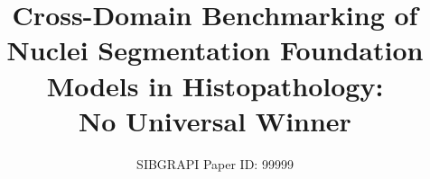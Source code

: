 \documentclass[10pt,conference]{IEEEtran}
\newif\iffinal
\newcommand{\cmtid}{99999}
\begin{document}
\title{Cross-Domain Benchmarking of Nuclei Segmentation Foundation Models in Histopathology:\\ No Universal Winner}

\iffinal
\author{\IEEEauthorblockN{Lucca S. P. Lacerda\IEEEauthorrefmark{1},
Matheus Fagundes\IEEEauthorrefmark{1},
Marcela F. A. Ribeiro\IEEEauthorrefmark{2},
Martinho C. R. Horta\IEEEauthorrefmark{2},
Giovanna R. Souto\IEEEauthorrefmark{2},\\
Alexandre X. Falc\~ao\IEEEauthorrefmark{3},
Gustavo K. Rohde\IEEEauthorrefmark{4},
Zenilton K. G. Patroc\'inio Jr\IEEEauthorrefmark{1} and
Silvio Jamil F. Guimar\~aes\IEEEauthorrefmark{1}}
\IEEEauthorblockA{\IEEEauthorrefmark{1}Laboratory of Image and Multimedia Data Science (IMScience)\\
Pontifical Catholic University of Minas Gerais, Belo Horizonte, Brazil\\
\IEEEauthorblockA{\IEEEauthorrefmark{2}Institute of Biological Science and Health\\
Pontifical Catholic University of Minas Gerais, Belo Horizonte, Brazil, 31980--110}
\IEEEauthorblockA{\IEEEauthorrefmark{3}Institute of Computing, Unicamp, Campinas, Brazil}
\IEEEauthorblockA{\IEEEauthorrefmark{4}Imaging and Data Science Lab\\
University of Virginia, Charlottesville, VA, USA\\
Email: lsplacerda@sga.pucminas.br, zenilton@pucminas.br, gustavo@virginia.edu,\\
abrahao.marcela@hotmail.com, martinhohorta@pucminas.br, grsouto@hotmail.com,\\
alexandre.falcao@gmail.com, sjamil@pucminas.br}
}}
\else
  \author{SIBGRAPI Paper ID: \cmtid \\ }
  \linenumbers
\fi

\maketitle
\end{document}
